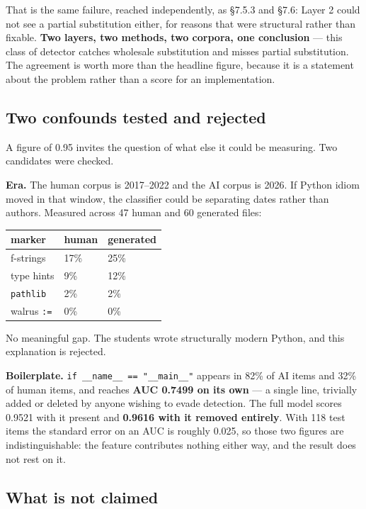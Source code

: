 That is the same failure, reached independently, as \S{}7.5.3 and \S{}7.6:
Layer 2 could not see a partial substitution either, for reasons that
were structural rather than fixable. \textbf{Two layers, two methods,
two corpora, one conclusion} --- this class of detector catches
wholesale substitution and misses partial substitution. The agreement is
worth more than the headline figure, because it is a statement about the
problem rather than a score for an implementation.

\hypertarget{two-confounds-tested-and-rejected}{%
\subsection{Two confounds tested and
rejected}\label{two-confounds-tested-and-rejected}}

A figure of 0.95 invites the question of what else it could be
measuring. Two candidates were checked.

\textbf{Era.} The human corpus is 2017--2022 and the AI corpus is 2026.
If Python idiom moved in that window, the classifier could be separating
dates rather than authors. Measured across 47 human and 60 generated
files:

\begin{longtable}[]{@{}lll@{}}
\toprule\noalign{}
marker & human & generated \\
\midrule\noalign{}
\endhead
\bottomrule\noalign{}
\endlastfoot
f-strings & 17\% & 25\% \\
type hints & 9\% & 12\% \\
\texttt{pathlib} & 2\% & 2\% \\
walrus \texttt{:=} & 0\% & 0\% \\
\end{longtable}

No meaningful gap. The students wrote structurally modern Python, and
this explanation is rejected.

\textbf{Boilerplate.} \texttt{if\ \_\_name\_\_\ ==\ "\_\_main\_\_"}
appears in 82\% of AI items and 32\% of human items, and reaches
\textbf{AUC 0.7499 on its own} --- a single line, trivially added or
deleted by anyone wishing to evade detection. The full model scores
0.9521 with it present and \textbf{0.9616 with it removed entirely}.
With 118 test items the standard error on an AUC is roughly 0.025, so
those two figures are indistinguishable: the feature contributes nothing
either way, and the result does not rest on it.

\hypertarget{what-is-not-claimed}{%
\subsection{What is not claimed}\label{what-is-not-claimed}}

